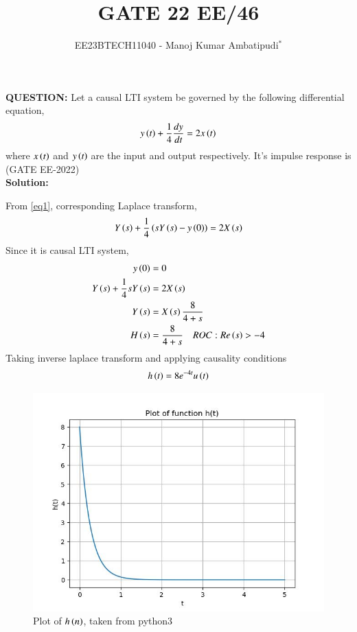 \documentclass[journal,12pt,twocolumn]{IEEEtran}
\theoremstyle{remark}
\begin{document}

\vspace{3cm}
\title{GATE 22 EE/46}
\author{EE23BTECH11040 - Manoj Kumar Ambatipudi$^{*}$%
}
\maketitle
\newpage
\bigskip
\renewcommand{\thefigure}{\theenumi}
\renewcommand{\thetable}{\theenumi}
\textbf{QUESTION:}
Let a causal LTI system be governed by the following differential equation, 
\begin{align}
    y\left(t\right) + \frac{1}{4}\frac{dy}{dt} = 2x\left(t\right) \label{eq1}
\end{align}
where $x\left(t\right)$ and $y\left(t\right)$ are the input and output respectively. It's impulse response is 
\hfill (GATE EE-2022)\\
\textbf{Solution:}

From \eqref{eq1}, corresponding Laplace transform, 
\begin{align}
    Y\left(s\right) + \frac{1}{4}\left(sY\left(s\right) - y\left(0\right)\right) = 2X\left(s\right)
\end{align}
Since it is causal LTI system, 
\begin{align}
    y\left(0\right) &= 0\\
	Y\left(s\right) + \frac{1}{4}sY\left(s\right) &= 2X\left(s\right)\\
    Y\left(s\right) &= X\left(s\right)\frac{8}{4 + s}\\
    H\left(s\right) &= \frac{8}{4 + s}\quad ROC:Re\left(s\right) > -4
\end{align}
Taking inverse laplace transform and applying causality conditions 
\begin{align}
    h\left(t\right) = 8e^{-4t}u\left(t\right)
\end{align}
\begin{figure}[h]
\renewcommand\thefigure{1}
    \centering
    \includegraphics[width=1.0\columnwidth]{figs/fig_1.jpg}
    \caption{Plot of $h\left(n\right)$, taken from python3}
    \label{fig:enter-label}
\end{figure}
\end{document}
